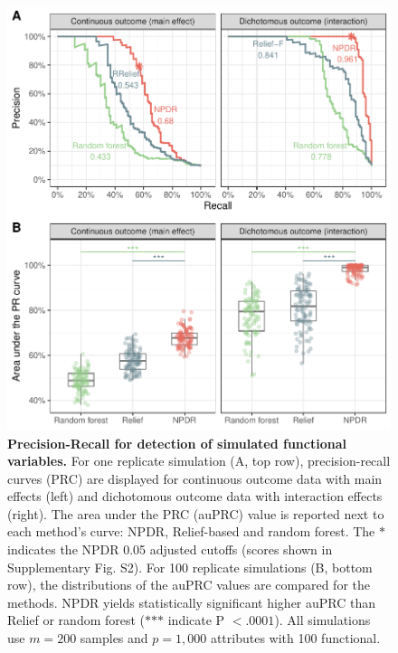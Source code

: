 \documentclass{bioinfo}
\begin{document}
\begin{figure}[!tbp]
\centerline{\includegraphics[trim = 0 0 0 0, scale = 0.55, clip]{../../figs/pr_compare_100.pdf}}
\caption{{\bf Precision-Recall for detection of simulated functional variables.} For one replicate simulation (A, top row), precision-recall curves (PRC) are displayed for continuous outcome data with main effects (left) and dichotomous outcome data with interaction effects (right). The area under the PRC (auPRC) value is reported next to each method's curve: NPDR, Relief-based and random forest. The $\ast$ indicates the NPDR 0.05 adjusted cutoffs (scores shown in Supplementary Fig. S2). For 100 replicate simulations (B, bottom row), the distributions of the auPRC values are compared for the methods. NPDR yields statistically significant higher auPRC than Relief or random forest ($\ast$$\ast$$\ast$ indicate P $<.0001$). All simulations use $m = 200$ samples and $p = 1,000$ attributes with 100 functional.}
\label{fig:pr_curve}
\end{figure}
\end{document}
